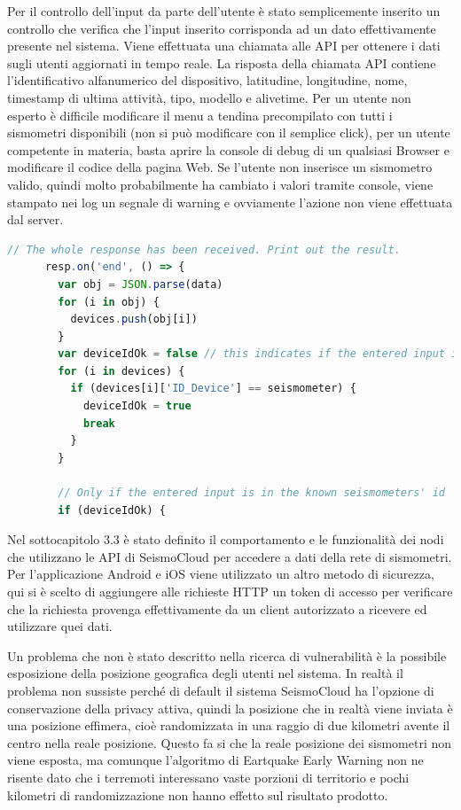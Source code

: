 \documentclass[a4paper,10pt]{memoir}
\begin{document}
Per il controllo dell'input da parte dell'utente è stato semplicemente inserito un controllo che verifica che l'input inserito corrisponda ad un dato effettivamente presente nel sistema.
Viene effettuata una chiamata alle API per ottenere i dati sugli utenti aggiornati in tempo reale.
La risposta della chiamata API contiene l'identificativo alfanumerico del dispositivo, latitudine, longitudine, nome, timestamp di ultima attività, tipo, modello e alivetime.
Per un utente non esperto è difficile modificare il menu a tendina precompilato con tutti i sismometri disponibili (non si può modificare con il semplice click), per un utente competente in materia, basta aprire la console di debug di un qualsiasi Browser e modificare il codice della pagina Web.
Se l'utente non inserisce un sismometro valido, quindi molto probabilmente ha cambiato i valori tramite console, viene stampato nei log un segnale di warning e ovviamente l'azione non viene effettuata dal server.
\begin{lstlisting}[language=Javascript, firstnumber=34]
    // The whole response has been received. Print out the result.
      resp.on('end', () => {
        var obj = JSON.parse(data)
        for (i in obj) {
          devices.push(obj[i])
        }
        var deviceIdOk = false // this indicates if the entered input is in the group seismometers
        for (i in devices) {
          if (devices[i]['ID_Device'] == seismometer) {
            deviceIdOk = true
            break
          }
        }

        // Only if the entered input is in the known seismometers' id
        if (deviceIdOk) {
\end{lstlisting}

Nel sottocapitolo 3.3 è stato definito il comportamento e le funzionalità dei nodi che utilizzano le API di SeismoCloud per accedere a dati della rete di sismometri.
Per l'applicazione Android e iOS viene utilizzato un altro metodo di sicurezza, qui si è scelto di aggiungere alle richieste HTTP un token di accesso per verificare che la richiesta provenga effettivamente da un client autorizzato a ricevere ed utilizzare quei dati.

Un problema che non è stato descritto nella ricerca di vulnerabilità è la possibile esposizione della posizione geografica degli utenti nel sistema. In realtà il problema non sussiste perché di default il sistema SeismoCloud ha l'opzione di conservazione della privacy attiva, quindi la posizione che in realtà viene inviata è una posizione effimera, cioè randomizzata in una raggio di due kilometri avente il centro nella reale posizione. Questo fa si che la reale posizione dei sismometri non viene esposta, ma comunque l'algoritmo di Eartquake Early Warning non ne risente dato che i terremoti interessano vaste porzioni di territorio e pochi kilometri di randomizzazione non hanno effetto sul risultato prodotto.
\end{document}
